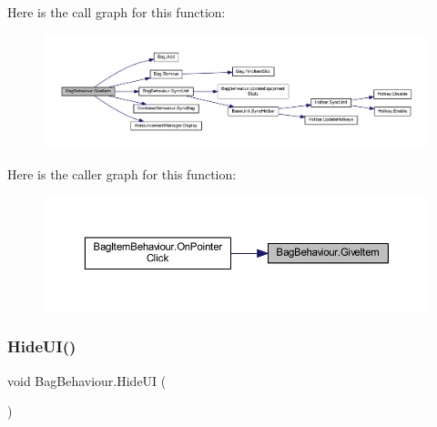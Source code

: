 Here is the call graph for this function\+:
\nopagebreak
\begin{figure}[H]
\begin{center}
\leavevmode
\includegraphics[width=350pt]{class_bag_behaviour_ac72b22f2f0340663e461c4a10f33281d_cgraph}
\end{center}
\end{figure}
Here is the caller graph for this function\+:
\nopagebreak
\begin{figure}[H]
\begin{center}
\leavevmode
\includegraphics[width=350pt]{class_bag_behaviour_ac72b22f2f0340663e461c4a10f33281d_icgraph}
\end{center}
\end{figure}
\mbox{\label{class_bag_behaviour_a731b060bd01b971246839664dfd86530}} 
\subsubsection{\texorpdfstring{HideUI()}{HideUI()}}
{\footnotesize\ttfamily void Bag\+Behaviour.\+Hide\+UI (\begin{DoxyParamCaption}{ }\end{DoxyParamCaption})}

